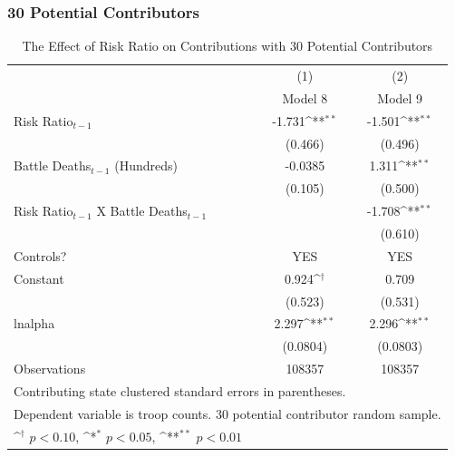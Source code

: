 \documentclass{beamer}
\begin{document}

\begin{frame}[fragile]
\frametitle{30 Potential Contributors}

\begin{table}[htbp]\centering
\tiny
\def\sym#1{\ifmmode^{#1}\else\(^{#1}\)\fi}
\caption{The Effect of Risk Ratio on Contributions with 30 Potential Contributors \label{Table 7}}
\vspace{0.4cm}
\begin{tabular}{l*{2}{c}}
\hline\hline
                    &\multicolumn{1}{c}{(1)}        &\multicolumn{1}{c}{(2)}        \\
                    &          Model 8        &          Model 9        \\
\hline
Risk Ratio$_{t-1}$          &      -1.731\sym{**}&      -1.501\sym{**}\\
                    &     (0.466)        &     (0.496)        \\
[1em]
Battle Deaths$_{t-1}$ (Hundreds)&     -0.0385        &       1.311\sym{**}\\
                    &     (0.105)        &     (0.500)        \\
[1em]
Risk Ratio$_{t-1}$ X Battle Deaths$_{t-1}$&                    &      -1.708\sym{**}\\
                    &                    &     (0.610)        \\
[1em]
Controls?           &        YES         &        YES         \\
[1em]
Constant            &       0.924\sym{\dagger} &       0.709        \\
                    &     (0.523)        &     (0.531)        \\
\hline
lnalpha             &       2.297\sym{**}&       2.296\sym{**}\\
                    &    (0.0804)        &    (0.0803)        \\
\hline
Observations        &      108357        &      108357        \\
\hline\hline
\multicolumn{3}{l}{\tiny Contributing state clustered standard errors in parentheses.}\\
\multicolumn{3}{l}{\tiny Dependent variable is troop counts. 30 potential contributor random sample.}\\
\multicolumn{3}{l}{\tiny \sym{\dagger} \(p<0.10\), \sym{*} \(p<0.05\), \sym{**} \(p<0.01\)}\\
\end{tabular}
\end{table}

\end{frame}
\end{document}
